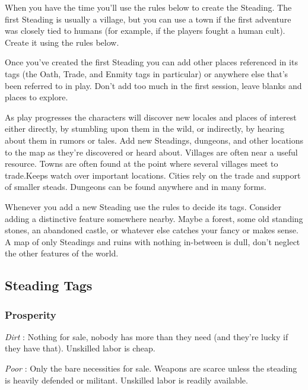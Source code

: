        

When you have the time you'll use the rules below to create the Steading. The first Steading is usually a village, but you can use a town if the first adventure was closely tied to humans (for example, if the players fought a human cult). Create it using the rules below.

       

Once you've created the first Steading you can add other places referenced in its tags (the Oath, Trade, and Enmity tags in particular) or anywhere else that's been referred to in play. Don't add too much in the first session, leave blanks and places to explore.

       

As play progresses the characters will discover new locales and places of interest either directly, by stumbling upon them in the wild, or indirectly, by hearing about them in rumors or tales. Add new Steadings, dungeons, and other locations to the map as they're discovered or heard about. Villages are often near a useful resource. Towns are often found at the point where several villages meet to trade.Keeps watch over important locations. Cities rely on the trade and support of smaller steads. Dungeons can be found anywhere and in many forms.

       

Whenever you add a new Steading use the rules to decide its tags. Consider adding a distinctive feature somewhere nearby. Maybe a forest, some old standing stones, an abandoned castle, or whatever else catches your fancy or makes sense. A map of only Steadings and ruins with nothing in-between is dull, don't neglect the other features of the world.

       
\subsection{Steading Tags}   
       
\subsubsection{Prosperity}   
       

         {\em Dirt} : Nothing for sale, nobody has more than they need (and they're lucky if they have that). Unskilled labor is cheap.

       

         {\em Poor} : Only the bare necessities for sale. Weapons are scarce unless the steading is heavily defended or militant. Unskilled labor is readily available.

